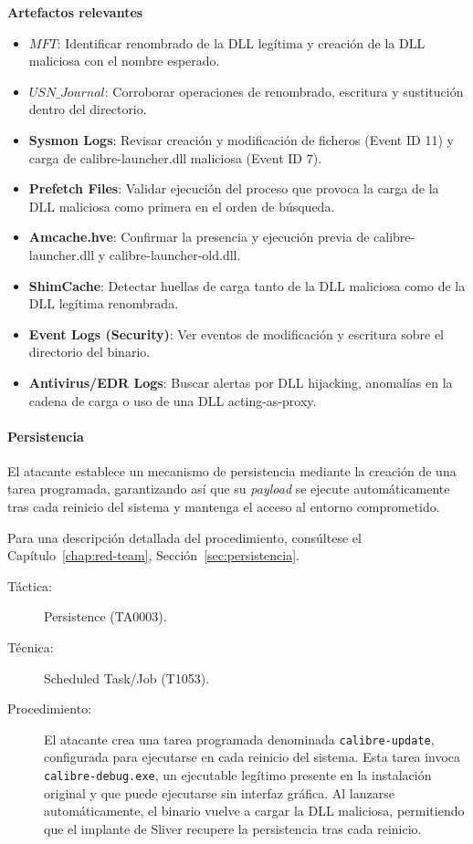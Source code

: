 \textbf{Artefactos relevantes}
\begin{itemize}
    \item \textbf{$MFT$}: Identificar renombrado de la DLL legítima y creación de la DLL maliciosa con el nombre esperado.
    \item \textbf{$USN\_Journal$}: Corroborar operaciones de renombrado, escritura y sustitución dentro del directorio.
    \item \textbf{Sysmon Logs}: Revisar creación y modificación de ficheros (Event ID 11) y carga de calibre-launcher.dll maliciosa (Event ID 7).
    \item \textbf{Prefetch Files}: Validar ejecución del proceso que provoca la carga de la DLL maliciosa como primera en el orden de búsqueda.
    \item \textbf{Amcache.hve}: Confirmar la presencia y ejecución previa de calibre-launcher.dll y calibre-launcher-old.dll.
    \item \textbf{ShimCache}: Detectar huellas de carga tanto de la DLL maliciosa como de la DLL legítima renombrada.
    \item \textbf{Event Logs (Security)}: Ver eventos de modificación y escritura sobre el directorio del binario.
    \item \textbf{Antivirus/EDR Logs}: Buscar alertas por DLL hijacking, anomalías en la cadena de carga o uso de una DLL acting-as-proxy.
\end{itemize}

\paragraph{Persistencia} El atacante establece un mecanismo de persistencia mediante la creación de una tarea programada, garantizando así que su \textit{payload} se ejecute automáticamente tras cada reinicio del sistema y mantenga el acceso al entorno comprometido.

Para una descripción detallada del procedimiento, consúltese el Capítulo~\ref{chap:red-team}, Sección~\ref{sec:persistencia}.

\begin{leftbar}
    \begin{description}
        \item[Táctica:] Persistence (TA0003).
        \item[Técnica:] Scheduled Task/Job (T1053).
        \item[Procedimiento:]  
        El atacante crea una tarea programada denominada \texttt{calibre-update}, configurada para ejecutarse en cada reinicio del sistema. Esta tarea invoca \texttt{calibre-debug.exe}, un ejecutable legítimo presente en la instalación original y que puede ejecutarse sin interfaz gráfica. Al lanzarse automáticamente, el binario vuelve a cargar la DLL maliciosa, permitiendo que el implante de Sliver recupere la persistencia tras cada reinicio.
    \end{description}
\end{leftbar}

